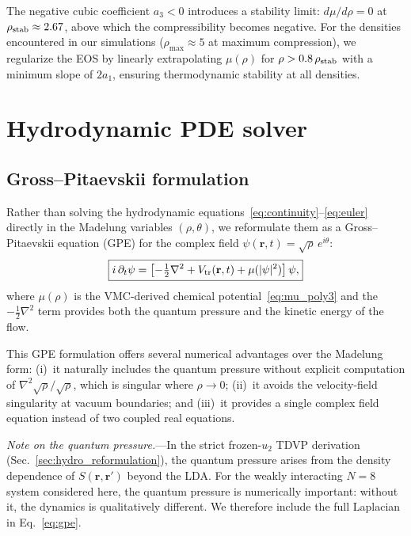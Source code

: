 \documentclass[twocolumn,superscriptaddress,aps,pra,longbibliography]{revtex4-2}
\newcommand{\br}{\mathbf{r}}
\begin{document}
The negative cubic coefficient $a_3 < 0$ introduces a stability limit:
$d\mu/d\rho = 0$ at
$\rho_{\rm stab} \approx 2.67$, above which the compressibility becomes
negative.  For the densities encountered in our simulations
($\rho_{\max} \approx 5$ at maximum compression), we regularize the EOS by
linearly extrapolating $\mu(\rho)$ for $\rho > 0.8\,\rho_{\rm stab}$ with
a minimum slope of $2a_1$, ensuring thermodynamic stability at all
densities.

\section{Hydrodynamic PDE solver}
\label{sec:hydro_solver}

\subsection{Gross--Pitaevskii formulation}

Rather than solving the hydrodynamic
equations~\eqref{eq:continuity}--\eqref{eq:euler} directly in the Madelung
variables $(\rho,\theta)$, we reformulate them as a Gross--Pitaevskii
equation (GPE) for the complex field
$\psi(\br,t) = \sqrt{\rho}\,e^{i\theta}$:
\begin{equation}
\boxed{
i\,\partial_t\psi = \left[-\tfrac{1}{2}\nabla^2
+ V_{\rm tr}(\br,t) + \mu(|\psi|^2)\right]\psi,
}
\label{eq:gpe}
\end{equation}
where $\mu(\rho)$ is the VMC-derived chemical potential~\eqref{eq:mu_poly3}
and the $-\frac{1}{2}\nabla^2$ term provides both the quantum pressure
and the kinetic energy of the flow.

This GPE formulation offers several numerical advantages over the Madelung
form: (i)~it naturally includes the quantum pressure without explicit
computation of $\nabla^2\sqrt\rho/\sqrt\rho$, which is singular where
$\rho\to 0$; (ii)~it avoids the velocity-field singularity at vacuum
boundaries; and (iii)~it provides a single complex field equation instead
of two coupled real equations.

\emph{Note on the quantum pressure.}---In the strict frozen-$u_2$ TDVP
derivation (Sec.~\ref{sec:hydro_reformulation}), the quantum pressure
arises from the density dependence of $S(\br,\br')$ beyond the LDA.  For
the weakly interacting $N=8$ system considered here, the quantum pressure
is numerically important: without it, the dynamics is qualitatively
different.  We therefore include the full Laplacian in
Eq.~\eqref{eq:gpe}.
\end{document}
